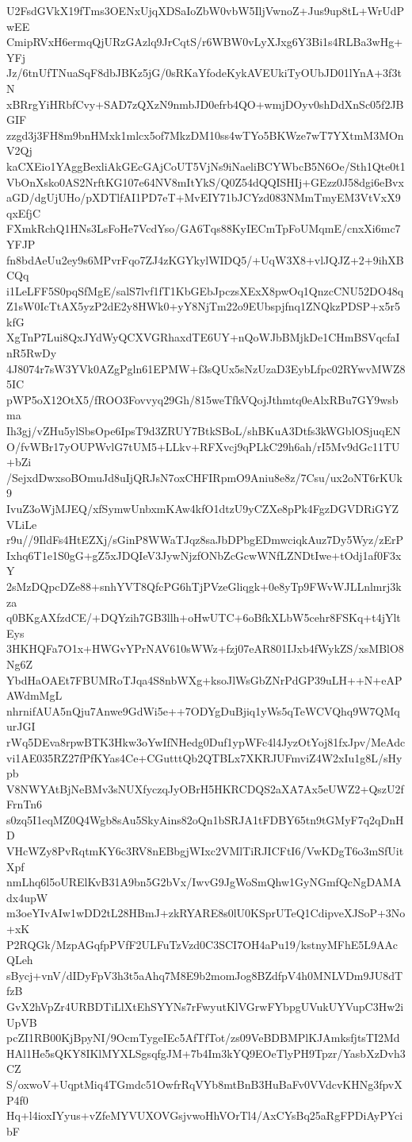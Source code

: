U2FsdGVkX19fTms3OENxUjqXDSaIoZbW0vbW5IljVwnoZ+Jus9up8tL+WrUdPwEE
CmipRVxH6ermqQjURzGAzlq9JrCqtS/r6WBW0vLyXJxg6Y3Bi1s4RLBa3wHg+YFj
Jz/6tnUfTNuaSqF8dbJBKz5jG/0sRKaYfodeKykAVEUkiTyOUbJD01lYnA+3f3tN
xBRrgYiHRbfCvy+SAD7zQXzN9nmbJD0efrb4QO+wmjDOyv0shDdXnSc05f2JBGIF
zzgd3j3FH8m9bnHMxk1mlcx5of7MkzDM10ss4wTYo5BKWze7wT7YXtmM3MOnV2Qj
kaCXEio1YAggBexliAkGEcGAjCoUT5VjNs9iNaeliBCYWbcB5N6Oe/Sth1Qte0t1
VbOnXsko0AS2NrftKG107e64NV8mItYkS/Q0Z54dQQISHIj+GEzz0J58dgi6eBvx
aGD/dgUjUHo/pXDTlfAI1PD7eT+MvEIY71bJCYzd083NMmTmyEM3VtVxX9qxEfjC
FXmkRchQ1HNs3LsFoHe7VcdYso/GA6Tqs88KyIECmTpFoUMqmE/cnxXi6mc7YFJP
fn8bdAeUu2ey9s6MPvrFqo7ZJ4zKGYkylWIDQ5/+UqW3X8+vlJQJZ+2+9ihXBCQq
i1LeLFF5S0pqSfMgE/salS7lvf1fT1KbGEbJpczsXExX8pwOq1QnzcCNU52DO48q
Z1sW0IcTtAX5yzP2dE2y8HWk0+yY8NjTm22o9EUbspjfnq1ZNQkzPDSP+x5r5kfG
XgTnP7Lui8QxJYdWyQCXVGRhaxdTE6UY+nQoWJbBMjkDe1CHmBSVqcfaInR5RwDy
4J8074r7sW3YVk0AZgPgln61EPMW+f3sQUx5sNzUzaD3EybLfpc02RYwvMWZ85IC
pWP5oX12OtX5/fROO3Fovvyq29Gh/815weTfkVQojJthmtq0eAlxRBu7GY9wsbma
Ih3gj/vZHu5ylSbsOpe6IpsT9d3ZRUY7BtkSBoL/shBKuA3Dtfs3kWGblOSjuqEN
O/fvWBr17yOUPWvlG7tUM5+LLkv+RFXvcj9qPLkC29h6ah/rI5Mv9dGc11TU+bZi
/SejxdDwxsoBOmuJd8uIjQRJsN7oxCHFIRpmO9Aniu8e8z/7Csu/ux2oNT6rKUk9
IvuZ3oWjMJEQ/xfSymwUnbxmKAw4kfO1dtzU9yCZXe8pPk4FgzDGVDRiGYZVLiLe
r9u//9IldFs4HtEZXj/sGinP8WWaTJqz8saJbDPbgEDmwciqkAuz7Dy5Wyz/zErP
Ixhq6T1e1S0gG+gZ5xJDQIeV3JywNjzfONbZcGcwWNfLZNDtIwe+tOdj1af0F3xY
2sMzDQpcDZe88+snhYVT8QfcPG6hTjPVzeGliqgk+0e8yTp9FWvWJLLnlmrj3kza
q0BKgAXfzdCE/+DQYzih7GB3llh+oHwUTC+6oBfkXLbW5cehr8FSKq+t4jYltEys
3HKHQFa7O1x+HWGvYPrNAV610sWWz+fzj07eAR801IJxb4fWykZS/xsMBlO8Ng6Z
YbdHaOAEt7FBUMRoTJqa4S8nbWXg+ksoJlWsGbZNrPdGP39uLH++N+eAPAWdmMgL
nhrnifAUA5nQju7Anwe9GdWi5e++7ODYgDuBjiq1yWs5qTeWCVQhq9W7QMqurJGI
rWq5DEva8rpwBTK3Hkw3oYwIfNHedg0Duf1ypWFc4l4JyzOtYoj81fxJpv/MeAdc
vi1AE035RZ27fPfKYas4Ce+CGutttQb2QTBLx7XKRJUFmviZ4W2xIu1g8L/sHypb
V8NWYAtBjNeBMv3sNUXfyczqJyOBrH5HKRCDQS2aXA7Ax5eUWZ2+QszU2fFrnTn6
s0zq5I1eqMZ0Q4Wgb8sAu5SkyAins82oQn1bSRJA1tFDBY65tn9tGMyF7q2qDnHD
VHcWZy8PvRqtmKY6c3RV8nEBbgjWIxc2VMlTiRJICFtI6/VwKDgT6o3mSfUitXpf
nmLhq6l5oURElKvB31A9bn5G2bVx/IwvG9JgWoSmQhw1GyNGmfQcNgDAMAdx4upW
m3oeYIvAIw1wDD2tL28HBmJ+zkRYARE8s0lU0KSprUTeQ1CdipveXJSoP+3No+xK
P2RQGk/MzpAGqfpPVfF2ULFuTzVzd0C3SCI7OH4aPu19/kstnyMFhE5L9AAcQLeh
sBycj+vnV/dIDyFpV3h3t5aAhq7M8E9b2momJog8BZdfpV4h0MNLVDm9JU8dTfzB
GvX2hVpZr4URBDTiLlXtEhSYYNs7rFwyutKlVGrwFYbpgUVukUYVupC3Hw2iUpVB
pcZI1RB00KjBpyNI/9OcmTygeIEc5AfTfTot/zs09VeBDBMPlKJAmksfjtsTI2Md
HAl1He5sQKY8IKlMYXLSgsqfgJM+7b4Im3kYQ9EOeTlyPH9Tpzr/YasbXzDvh3CZ
S/oxwoV+UqptMiq4TGmdc51OwfrRqVYb8mtBnB3HuBaFv0VVdcvKHNg3fpvXP4f0
Hq+l4ioxIYyus+vZfeMYVUXOVGsjvwoHhVOrTl4/AxCYsBq25aRgFPDiAyPYcibF
